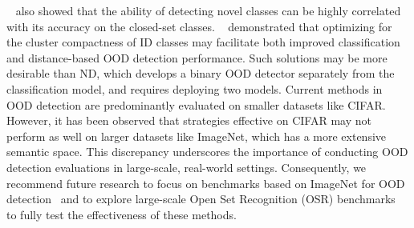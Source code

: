 ~ also showed that the ability of detecting novel classes can be highly correlated with its accuracy on the closed-set classes.
~ demonstrated that optimizing for the cluster compactness of ID classes may facilitate both improved classification and distance-based OOD detection performance. Such solutions may be more desirable than ND, which develops a binary OOD detector separately from the classification model, and requires deploying two models. 
Current methods in OOD detection are predominantly evaluated on smaller datasets like CIFAR. However, it has been observed that strategies effective on CIFAR may not perform as well on larger datasets like ImageNet, which has a more extensive semantic space. This discrepancy underscores the importance of conducting OOD detection evaluations in large-scale, real-world settings. Consequently, we recommend future research to focus on benchmarks based on ImageNet for OOD detection~ and to explore large-scale Open Set Recognition (OSR) benchmarks~ to fully test the effectiveness of these methods. 


